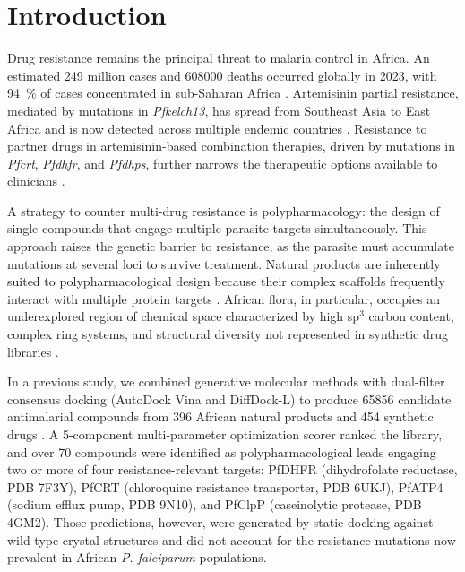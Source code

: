 \documentclass[11pt,a4paper]{article}
\begin{document}
\section{Introduction}

Drug resistance remains the principal threat to malaria control in Africa. An estimated \num{249} million cases and \num{608000} deaths occurred globally in 2023, with \qty{94}{\percent} of cases concentrated in sub-Saharan Africa \citep{who_malaria_2025}. Artemisinin partial resistance, mediated by mutations in \textit{Pfkelch13}, has spread from Southeast Asia to East Africa and is now detected across multiple endemic countries \citep{global_resistance_landscape_2026}. Resistance to partner drugs in artemisinin-based combination therapies, driven by mutations in \textit{Pfcrt}, \textit{Pfdhfr}, and \textit{Pfdhps}, further narrows the therapeutic options available to clinicians \citep{africa_resistance_2026,pfk13_resistance_2026}.

A strategy to counter multi-drug resistance is polypharmacology: the design of single compounds that engage multiple parasite targets simultaneously. This approach raises the genetic barrier to resistance, as the parasite must accumulate mutations at several loci to survive treatment. Natural products are inherently suited to polypharmacological design because their complex scaffolds frequently interact with multiple protein targets \citep{polypharmacology_malaria_2026,value_addition_african_np_2025}. African flora, in particular, occupies an underexplored region of chemical space characterized by high sp$^3$ carbon content, complex ring systems, and structural diversity not represented in synthetic drug libraries \citep{anpdb_2026}.

In a previous study, we combined generative molecular methods with dual-filter consensus docking (AutoDock Vina and DiffDock-L) to produce \num{65856} candidate antimalarial compounds from 396 African natural products and 454 synthetic drugs \citep{temgoua2026antimalarial}. A 5-component multi-parameter optimization scorer ranked the library, and over 70 compounds were identified as polypharmacological leads engaging two or more of four resistance-relevant targets: PfDHFR (dihydrofolate reductase, PDB 7F3Y), PfCRT (chloroquine resistance transporter, PDB 6UKJ), PfATP4 (sodium efflux pump, PDB 9N10), and PfClpP (caseinolytic protease, PDB 4GM2). Those predictions, however, were generated by static docking against wild-type crystal structures and did not account for the resistance mutations now prevalent in African \textit{P. falciparum} populations.
\end{document}
